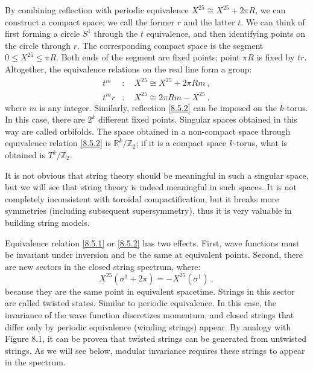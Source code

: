 By combining reflection with periodic equivalence $X^{25} \cong X^{25}+2 \pi R $, we can construct a compact space; we call the former $r$ and the latter $t$. 
We can think of first forming a circle $S^{1}$ through the $t$ equivalence, and then identifying points on the circle through $r$. 
The corresponding compact space is the segment $0 \leq X^{25} \leq \pi R$. 
Both ends of the segment are fixed points; point $\pi R$ is fixed by $tr$. 
Altogether, the equivalence relations on the real line form a group:
\begin{subequations} \label{8.5.3}
	\begin{align}
		t^{m}  &: \quad X^{25} \cong X^{25}+2 \pi R m  \:, \label{8.5.3a} \\	
		t^{m} r&: \quad  X^{25} \cong 2 \pi R m-X^{25} \:. \label{8.5.3b}
	\end{align}
\end{subequations}
where $m$ is any integer. 
Similarly, reflection \eqref{8.5.2} can be imposed on the $k$-torus. In this case, there are $2^{k}$ different fixed points. Singular spaces obtained in this way are called orbifolds. 
The space obtained in a non-compact space through equivalence relation \eqref{8.5.2} is $\mathds{R}^{k} / \mathds{Z}_{2}$; 
if it is a compact space $k$-torus, what is obtained is $T^{k} / \mathds{Z}_{2}$.

It is not obvious that string theory should be meaningful in such a singular space, but we will see that string theory is indeed meaningful in such spaces. 
It is not completely inconsistent with toroidal compactification, but it breaks more symmetries (including subsequent supersymmetry), thus it is very valuable in building string models.

Equivalence relation \eqref{8.5.1} or \eqref{8.5.2} has two effects. First, wave functions must be invariant under inversion and be the same at equivalent points. Second, there are new sectors in the closed string spectrum, where: 
\begin{equation}
	X^{25}(\sigma^{1}+2 \pi)=-X^{25}(\sigma^{1}) \:, \label{8.5.4}
\end{equation}
because they are the same point in equivalent spacetime. Strings in this sector are called twisted states. Similar to periodic equivalence. 
In this case, the invariance of the wave function discretizes momentum, and closed strings that differ only by periodic equivalence (winding strings) appear. 
By analogy with Figure 8.1, it can be proven that twisted strings can be generated from untwisted strings. 
As we will see below, modular invariance requires these strings to appear in the spectrum.


